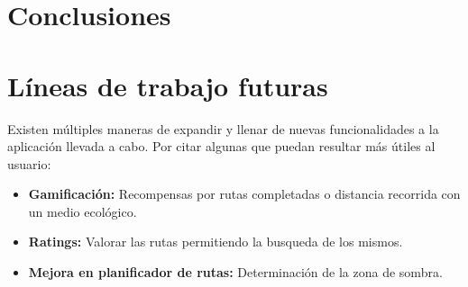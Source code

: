 \section*{Conclusiones}
\section*{Líneas de trabajo futuras}
Existen múltiples maneras de expandir y llenar de nuevas funcionalidades a la aplicación llevada a cabo.
Por citar algunas que puedan resultar más útiles al usuario:
\begin{itemize}
    \item \textbf{Gamificación:} Recompensas por rutas completadas o distancia recorrida con un medio ecológico.
    \item \textbf{Ratings:} Valorar las rutas permitiendo la busqueda de los mismos.
    \item \textbf{Mejora en planificador de rutas:} Determinación de la zona de sombra.
\end{itemize}